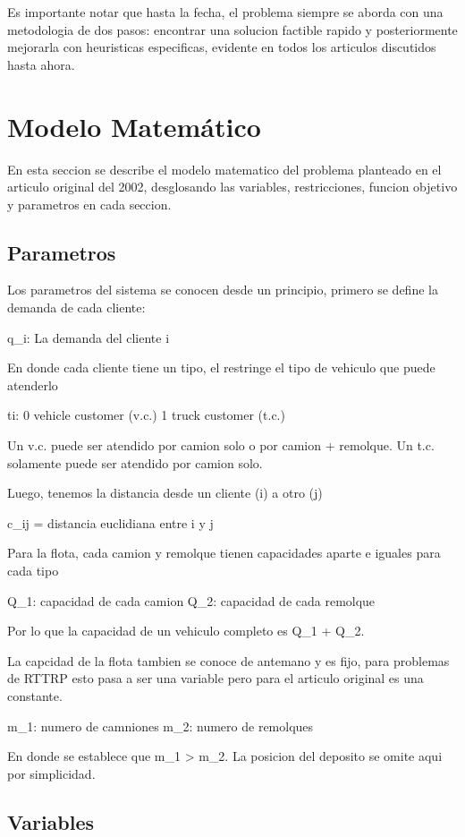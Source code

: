 \documentclass[letter, 10pt]{article}
\begin{document}
Es importante notar que hasta la fecha, el problema siempre se aborda con una metodologia de dos pasos: encontrar una solucion factible rapido y posteriormente
mejorarla con heuristicas especificas, evidente en todos los articulos discutidos hasta ahora.

\section{Modelo Matem\'atico}
En esta seccion se describe el modelo matematico del problema planteado en el articulo original del 2002, desglosando las variables, restricciones, funcion objetivo
y parametros en cada seccion.

\subsection{Parametros}
Los parametros del sistema se conocen desde un principio, primero se define la demanda de cada cliente:

q_i: La demanda del cliente i

En donde cada cliente tiene un tipo, el restringe el tipo de vehiculo que puede atenderlo

ti:
0 vehicle customer (v.c.)
1 truck customer (t.c.)

Un v.c. puede ser atendido por camion solo o por camion + remolque.
Un t.c. solamente puede ser atendido por camion solo.

Luego, tenemos la distancia desde un cliente (i) a otro (j)

c_ij = distancia euclidiana entre i y j

Para la flota, cada camion y remolque tienen capacidades aparte e iguales para cada tipo

Q_1: capacidad de cada camion
Q_2: capacidad de cada remolque

Por lo que la capacidad de un vehiculo completo es Q_1 + Q_2.

La capcidad de la flota tambien se conoce de antemano y es fijo, para problemas de RTTRP esto pasa
a ser una variable pero para el articulo original es una constante.

m_1: numero de camniones
m_2: numero de remolques

En donde se establece que m_1 > m_2. La posicion del deposito se omite aqui por simplicidad.

\subsection{Variables}
\end{document}
